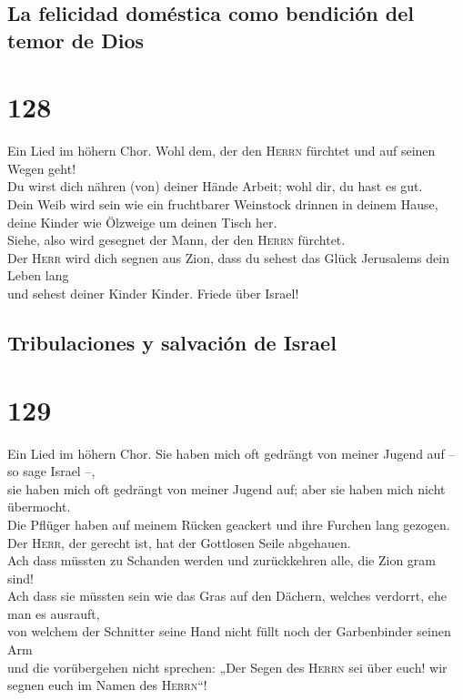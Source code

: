 \hypertarget{la-felicidad-domuxe9stica-como-bendiciuxf3n-del-temor-de-dios}{%
\subsection{La felicidad doméstica como bendición del temor de
Dios}\label{la-felicidad-domuxe9stica-como-bendiciuxf3n-del-temor-de-dios}}

\hypertarget{section-127}{%
\section{128}\label{section-127}}

 Ein Lied im höhern Chor. Wohl dem, der den \textsc{Herrn}
fürchtet und auf seinen Wegen geht!\\
 Du wirst dich nähren (von) deiner Hände Arbeit; wohl dir,
du hast es gut.\\
 Dein Weib wird sein wie ein fruchtbarer Weinstock drinnen
in deinem Hause, deine Kinder wie Ölzweige um deinen Tisch her.\\
 Siehe, also wird gesegnet der Mann, der den
\textsc{Herrn} fürchtet.\\
 Der \textsc{Herr} wird dich segnen aus Zion, dass du
sehest das Glück Jerusalems dein Leben lang\\
 und sehest deiner Kinder Kinder. Friede über Israel!

\hypertarget{tribulaciones-y-salvaciuxf3n-de-israel}{%
\subsection{Tribulaciones y salvación de
Israel}\label{tribulaciones-y-salvaciuxf3n-de-israel}}

\hypertarget{section-128}{%
\section{129}\label{section-128}}

 Ein Lied im höhern Chor. Sie haben mich oft gedrängt von
meiner Jugend auf -- so sage Israel --,\\
 sie haben mich oft gedrängt von meiner Jugend auf; aber
sie haben mich nicht übermocht.\\
 Die Pflüger haben auf meinem Rücken geackert und ihre
Furchen lang gezogen.\\
 Der \textsc{Herr}, der gerecht ist, hat der Gottlosen
Seile abgehauen.\\
 Ach dass müssten zu Schanden werden und zurückkehren
alle, die Zion gram sind!\\
 Ach dass sie müssten sein wie das Gras auf den Dächern,
welches verdorrt, ehe man es ausrauft,\\
 von welchem der Schnitter seine Hand nicht füllt noch der
Garbenbinder seinen Arm\\
 und die vorübergehen nicht sprechen: „Der Segen des
\textsc{Herrn} sei über euch! wir segnen euch im Namen des
\textsc{Herrn}``!

